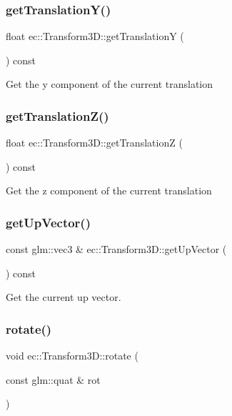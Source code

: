 \subsubsection{\texorpdfstring{get\+Translation\+Y()}{getTranslationY()}}
{\footnotesize\ttfamily float ec\+::\+Transform3\+D\+::get\+TranslationY (\begin{DoxyParamCaption}{ }\end{DoxyParamCaption}) const}

Get the y component of the current translation \mbox{\label{classec_1_1_transform3_d_a5d7ec019acf68cb930db1a7db79ef97f}} 
\subsubsection{\texorpdfstring{get\+Translation\+Z()}{getTranslationZ()}}
{\footnotesize\ttfamily float ec\+::\+Transform3\+D\+::get\+TranslationZ (\begin{DoxyParamCaption}{ }\end{DoxyParamCaption}) const}

Get the z component of the current translation \mbox{\label{classec_1_1_transform3_d_af8bdfb3bbc688a9a920ccb4d452d8962}} 
\subsubsection{\texorpdfstring{get\+Up\+Vector()}{getUpVector()}}
{\footnotesize\ttfamily const glm\+::vec3 \& ec\+::\+Transform3\+D\+::get\+Up\+Vector (\begin{DoxyParamCaption}{ }\end{DoxyParamCaption}) const}

Get the current up vector. \mbox{\label{classec_1_1_transform3_d_a24885ce6a9f002a00f7c263e4076ea6b}} 
\subsubsection{\texorpdfstring{rotate()}{rotate()}\hspace{0.1cm}{\footnotesize\ttfamily [1/2]}}
{\footnotesize\ttfamily void ec\+::\+Transform3\+D\+::rotate (\begin{DoxyParamCaption}\item[{const glm\+::quat \&}]{rot }\end{DoxyParamCaption})}


